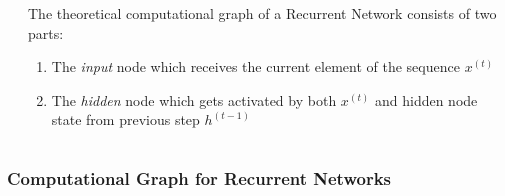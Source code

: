 \documentclass{beamer}
\begin{document}
\begin{frame}
\begin{columns}
\begin{column}{0.3\textwidth}
    \end{column}
    \begin{column}{0.7\textwidth}
      The theoretical computational graph of a Recurrent Network consists of two parts:
      \begin{enumerate}
        \item The \textit{input} node which receives the current element of the sequence \(x^{(t)}\)
        \item The \textit{hidden} node which gets activated by both \(x^{(t)}\) and hidden node state from previous step \(h^{(t-1)}\)
      \end{enumerate}
    \end{column}
  \end{columns}
\end{frame}
\begin{frame}
  \frametitle{Computational Graph for Recurrent Networks}
  \begin{columns}
    \begin{column}{0.3\textwidth}
      \begin{center}

\end{center}
\end{column}
\end{columns}
\end{frame}
\end{document}
